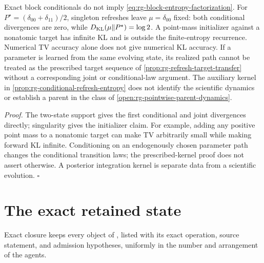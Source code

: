 Exact block conditionals do not imply
\eqref{eq:rg-block-entropy-factorization}. For
$P^\star=(\delta_{00}+\delta_{11})/2$, singleton refreshes leave
$\mu=\delta_{00}$ fixed: both conditional divergences are zero, while
$D_{\mathrm{KL}}(\mu\Vert P^\star)=\log2$. A point-mass initializer against a
nonatomic target has infinite KL and is outside the finite-entropy
recurrence. Numerical TV accuracy alone does not give numerical KL
accuracy. If a parameter is learned from the same evolving state, its
realized path cannot be treated as the prescribed target sequence of
\cref{prop:rg-refresh-target-transfer} without a corresponding joint or
conditional-law argument. The auxiliary kernel in
\cref{prop:rg-conditional-refresh-entropy} does not identify the
scientific dynamics or establish a parent in the class of
\cref{open:rg-pointwise-parent-dynamics}.

\noindent\emph{Proof.}
The two-state support gives the first conditional and joint divergences
directly; singularity gives the initializer claim. For example, adding
any positive point mass to a nonatomic target can make TV arbitrarily
small while making forward KL infinite. Conditioning on an endogenously
chosen parameter path changes the conditional transition laws; the
prescribed-kernel proof does not assert otherwise. A posterior integration
kernel is separate data from a scientific evolution.
\hfill$\square$

\section{The exact retained state}
\label{sec:rg-closure-theorem}

Exact closure keeps every object of , listed with its
exact operation, source statement, and admission hypotheses, uniformly in the
number and arrangement of the agents.


